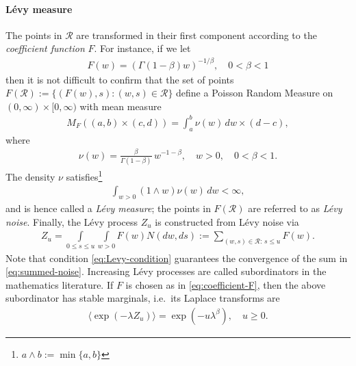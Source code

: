 \documentclass[a4paper,12pt]{elsarticle}
\numberwithin{equation}{section}
\theoremstyle{plain}
\theoremstyle{definition}
\theoremstyle{remark}
\numberwithin{equation}{section}
\newcommand{\1}{\mathbf 1}
\begin{document}
\paragraph{L\'evy measure}
The points in $\mathcal R$ are transformed in their first component according 
to the \emph{coefficient function} $F$.  For instance, if we let 
\begin{align} \label{eq:coefficient-F}
  F(w) = \left( \Gamma(1-\beta) w \right)^{-1/\beta}, \quad 0 < \beta < 1
\end{align}
then it is not difficult to confirm that the set of points 
$F(\mathcal R) := \{(F(w), s): (w,s) \in \mathcal R\}$ 
define a Poisson Random Measure on $(0,\infty) \times [0,\infty)$ with mean 
measure 
\begin{align}
  M_F((a,b) \times (c,d)) = \int_a^b \nu(w)\,dw \times (d-c),
\end{align}
where 
\begin{align} \label{eq:stable-levy-measure}
\nu(w) = \frac{\beta}{\Gamma(1-\beta)} \, w^{-1-\beta}, \quad w > 0, \quad 
0 < \beta < 1.
\end{align}
The density $\nu$ satisfies\footnote{$a \wedge b := \min\{a, b\}$}
\begin{align}
\label{eq:Levy-condition}
\int_{w > 0}(1 \wedge w) \nu(w)\,dw < \infty,  
\end{align}
and is hence called a \emph{L\'evy measure};
the points in $F(\mathcal R)$ are referred to as \emph{L\'evy noise}.
Finally, the L\'evy process $Z_u$ is constructed from L\'evy noise via 
\begin{align} \label{eq:summed-noise}
  Z_u = \int\limits_{0 \le s \le u} \int\limits_{w > 0} F(w) N(dw,ds)
  := \sum_{(w,s) \in \mathcal R:\, s \le u} F(w).
\end{align}
Note that condition \eqref{eq:Levy-condition} guarantees the convergence of the 
sum in \eqref{eq:summed-noise}. 
Increasing L\'evy processes are called subordinators in the mathematics
literature.  If $F$ is chosen as in \eqref{eq:coefficient-F}, then the above 
subordinator has stable marginals, i.e.\ its Laplace 
transforms are \citep{Bertoin04}
\begin{align}
  \langle \exp(-\lambda Z_u) \rangle = \exp(-u \lambda^\beta), \quad u \ge 0.
\end{align}
 
\end{document}
